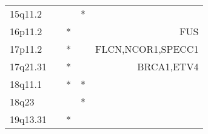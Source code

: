 \begin{tabular}{lcccr}
15q11.2  &           &     &       * &                                 \\
16p11.2  &           &   * &         &                             FUS \\
17p11.2  &           &   * &         &               FLCN,NCOR1,SPECC1 \\
17q21.31 &           &   * &         &                      BRCA1,ETV4 \\
18q11.1  &           &   * &       * &                                 \\
18q23    &           &     &       * &                                 \\
19q13.31 &           &   * &         &                                 \\
\bottomrule
\end{tabular}
